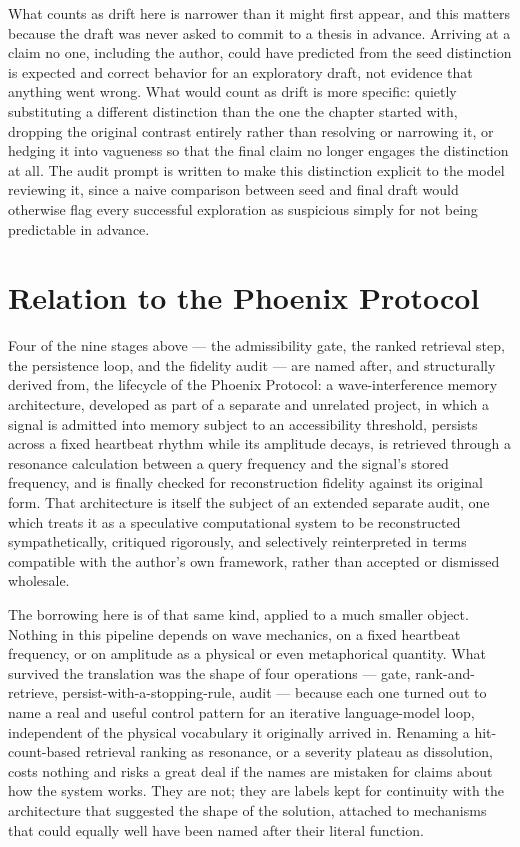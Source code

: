 \documentclass[11pt]{article}
\theoremstyle{definition}
\begin{document}
What counts as drift here is narrower than it might first appear, and
this matters because the draft was never asked to commit to a thesis in
advance. Arriving at a claim no one, including the author, could have
predicted from the seed distinction is expected and correct behavior
for an exploratory draft, not evidence that anything went wrong. What
would count as drift is more specific: quietly substituting a different
distinction than the one the chapter started with, dropping the
original contrast entirely rather than resolving or narrowing it, or
hedging it into vagueness so that the final claim no longer engages the
distinction at all. The audit prompt is written to make this
distinction explicit to the model reviewing it, since a naive
comparison between seed and final draft would otherwise flag every
successful exploration as suspicious simply for not being predictable
in advance.

\section{Relation to the Phoenix Protocol}
\label{sec:phoenix}

Four of the nine stages above --- the admissibility gate, the ranked
retrieval step, the persistence loop, and the fidelity audit --- are
named after, and structurally derived from, the lifecycle of the
Phoenix Protocol: a wave-interference memory architecture, developed as
part of a separate and unrelated project, in which a signal is
admitted into memory subject to an accessibility threshold, persists
across a fixed heartbeat rhythm while its amplitude decays, is
retrieved through a resonance calculation between a query frequency and
the signal's stored frequency, and is finally checked for
reconstruction fidelity against its original form. That architecture is
itself the subject of an extended separate audit, one which treats it
as a speculative computational system to be reconstructed
sympathetically, critiqued rigorously, and selectively reinterpreted in
terms compatible with the author's own framework, rather than accepted
or dismissed wholesale.

The borrowing here is of that same kind, applied to a much smaller
object. Nothing in this pipeline depends on wave mechanics, on a fixed
heartbeat frequency, or on amplitude as a physical or even metaphorical
quantity. What survived the translation was the shape of four
operations --- gate, rank-and-retrieve, persist-with-a-stopping-rule,
audit --- because each one turned out to name a real and useful control
pattern for an iterative language-model loop, independent of the
physical vocabulary it originally arrived in. Renaming a hit-count-based
retrieval ranking as resonance, or a severity plateau as dissolution,
costs nothing and risks a great deal if the names are mistaken for
claims about how the system works. They are not; they are labels kept
for continuity with the architecture that suggested the shape of the
solution, attached to mechanisms that could equally well have been
named after their literal function.
\end{document}
